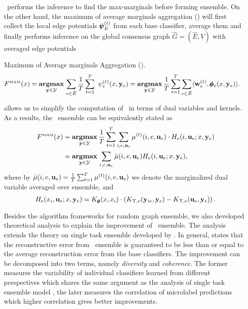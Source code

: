 {%
\amm\ performs the inference to find the max-marginals before forming ensemble. 
On the other hand, the maximum of average marginals aggregation (\mam) will first collect the local edge potentials $\pmb \psi_E^{(t)}$ from each base classifier, average them and finally performs inference on the global consensus graph $\hat{G}=(\hat{E},V)$ with averaged edge potentials
\begin{definition}{Maximum of Average marginals Aggregation (\mam).}
	\begin{align*}
		F^{\text{\tiny MAM}}(x) &= \underset{\vy \in \Ycal }{\argmax}\,\sum_{e\in \hat{E}}\frac{1}{T}\sum_{t=1}^{T}\ \psi^{(t)}_e(x,\vy_e)
		= \underset{\vy \in \Ycal}{\argmax}\, \frac{1}{T} \sum_{t=1}^T \sum_{e\in \hat{E}} \ip{\vw_e^{(t)}}{\phib_e(x,\vy_e)}. %
	\end{align*}
\end{definition}
 allows us to simplify the computation of \mam\ in terms of dual variables and kernels.
As a results, the \mam\ ensemble can be equivalently stated as
\begin{align*}
F^{\text{\tiny MAM}}(x) 
 & =\underset{\mathbf {y} \in \mathcal{Y}}{\textbf{argmax}}\, \frac{1}{T} \sum_{t=1}^T \sum_{i,e,\mathbf {u}_e} \mu^{(t)}(i,e,\mathbf {u}_e) \cdot H_e(i,\mathbf {u}_e;x,\mathbf {y}_e)\nonumber \\
 & =\underset{\mathbf {y} \in \mathcal{Y}}{\textbf{argmax}}\,   \sum_{i,e,\mathbf {u}_e}  \bar\mu(i,e,\mathbf {u}_e) H_e(i,\mathbf {u}_e;x,\mathbf {y}_e),
\end{align*}
where by $\bar\mu(i,e,\mathbf {u}_e)=\frac{1}{T}\sum_{t=1}^T\mu^{(t)}(i,e,\mathbf {u}_e)$ we denote the marginalized dual variable averaged over ensemble, and
\begin{align*}
	H_e(x_i,\mathbf {u}_e;x,\mathbf {y}_e)  = K_{\pmb \phi}(x,x_i)\cdot\left(K_{\Upsilon,e}(\mathbf {y}_{ie},\mathbf {y}_e)-K_{\Upsilon,e}(\mathbf {u}_e,\mathbf {y}_e)\right).
\end{align*}
	
Besides the algorithm frameworks for random graph ensemble, we also developed theoretical analysis to explain the improvement of \mam\ ensemble.
The analysis extends the theory on single task ensemble developed by \citet{Brown10good}.
In general,  states that the reconstructive error from \mam\ ensemble is guaranteed to be less than or equal to the average reconstruction error from the base classifiers.
The improvement can be decomposed into two terms, namely \textit{diversity} and \textit{coherence}.
The former measures the variability of individual classifiers learned from different perspectives which shares the same argument as the analysis of single task ensemble model \citep{Brown10good}, the later measures the correlation of microlabel predictions which higher correlation gives better improvements.

}
